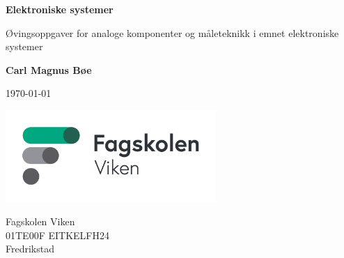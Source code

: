 \begin{titlepage}
    \begin{center}
    \vspace*{1cm}
    \Huge
    \textbf{Elektroniske systemer}
    
    \LARGE
    \vspace{0.5cm}
    Øvingsoppgaver for analoge komponenter og måleteknikk i emnet elektroniske systemer

    \vspace{1.5cm}
    \textbf{Carl Magnus Bøe}
    
    \today

\vfill




    \includegraphics[width=0.6\textwidth]{frontmatter/bilder/r171JViZ6gmf8WXujFQw.jpg}
    \Large
    
    Fagskolen Viken\\
    01TE00F EITKELFH24\\
    Fredrikstad\\

    \end{center}
\end{titlepage}